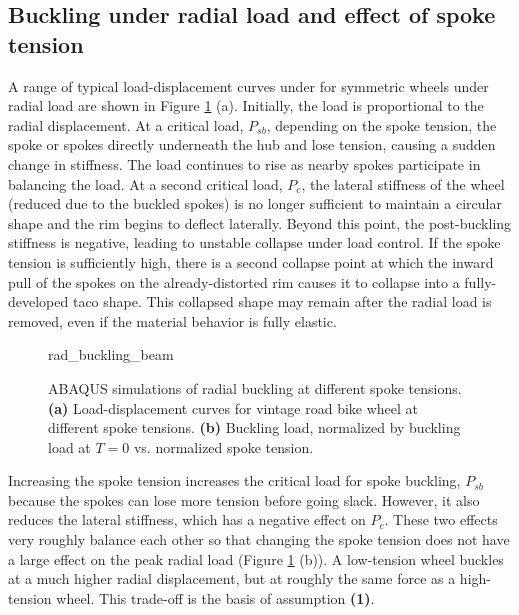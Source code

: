 \documentclass[\rootdir/thesis.tex]{subfiles}
\begin{document}

\subsection{Buckling under radial load and effect of spoke tension}

A range of typical load-displacement curves under for symmetric wheels under radial load are shown in Figure \ref{fig:rad_buckling_beam} (a). Initially, the load is proportional to the radial displacement. At a critical load, $P_{sb}$, depending on the spoke tension, the spoke or spokes directly underneath the hub and lose tension, causing a sudden change in stiffness. The load continues to rise as nearby spokes participate in balancing the load. At a second critical load, $P_c$, the lateral stiffness of the wheel (reduced due to the buckled spokes) is no longer sufficient to maintain a circular shape and the rim begins to deflect laterally. Beyond this point, the post-buckling stiffness is negative, leading to unstable collapse under load control. If the spoke tension is sufficiently high, there is a second collapse point at which the inward pull of the spokes on the already-distorted rim causes it to collapse into a fully-developed taco shape. This collapsed shape may remain after the radial load is removed, even if the material behavior is fully elastic.

\begin{figure}
\centering
{rad_buckling_beam}
\caption{ABAQUS simulations of radial buckling at different spoke tensions. \textbf{(a)} Load-displacement curves for vintage road bike wheel at different spoke tensions. \textbf{(b)} Buckling load, normalized by buckling load at $T=0$ vs. normalized spoke tension.}
\label{fig:rad_buckling_beam}
\end{figure}

Increasing the spoke tension increases the critical load for spoke buckling, $P_{sb}$ because the spokes can lose more tension before going slack. However, it also reduces the lateral stiffness, which has a negative effect on $P_c$. These two effects very roughly balance each other so that changing the spoke tension does not have a large effect on the peak radial load (Figure \ref{fig:rad_buckling_beam} (b)). A low-tension wheel buckles at a much higher radial displacement, but at roughly the same force as a high-tension wheel. This trade-off is the basis of assumption \textbf{(1)}.
\end{document}
